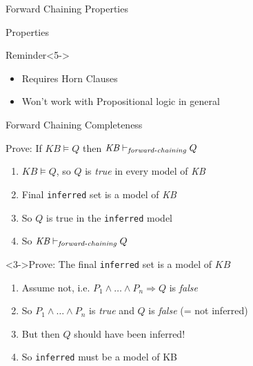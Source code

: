 \documentclass[14pt]{beamer}
\newcommand{\limpl}{\Rightarrow}
\begin{document}
\begin{frame}{Forward Chaining Properties}
\begin{block}{Properties}
\begin{description}[Complete?]
\item[Sound?] 
\item[Complete?] 
\item[Time?] 
\end{description}
\end{block}
\begin{block}{Reminder}<5->
\begin{itemize}
\item Requires Horn Clauses
\item Won't work with Propositional logic in general
\end{itemize}
\end{block}
\end{frame}

\begin{frame}{Forward Chaining Completeness}
	\begin{block}{Prove: If $\textit{KB} \models Q$ then $\textit{KB} \vdash_{\textit{\scriptsize forward-chaining}} Q$}
		\begin{enumerate}
			\item<2-> $\textit{KB} \models Q$, so $Q$ is \emph{true} in every model of \emph{KB}
			\item<4-> Final \texttt{inferred} set is a model of \emph{KB}
			\item<4-> So $Q$ is true in the \texttt{inferred} model
			\item<4-> So $\textit{KB} \vdash_{\textit{\scriptsize forward-chaining}} Q$
		\end{enumerate}
	\end{block}
	\begin{block}<3->{Prove: The final \texttt{inferred} set is a model of $\textit{KB}$}
		\begin{enumerate}
			\item Assume not, i.e. $P_1 \land \ldots \land P_n \limpl Q$ is \emph{false}
			\item So $P_1 \land \ldots \land P_n$ is \emph{true} and $Q$ is \emph{false} (= not inferred)
			\item But then $Q$ should have been inferred!
			\item So \texttt{inferred} must be a model of KB
		\end{enumerate}
	\end{block}
\end{frame}
\end{document}
